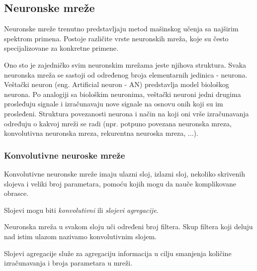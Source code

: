 \documentclass{article}
\begin{document}
\subsection{Neuronske mreže}
Neuronske mreže trenutno predstavljaju metod mašinskog učenja sa najširim spektrom primena. Postoje različite vrste neuronskih mreža, koje su često specijalizovane za konkretne primene. 

Ono sto je zajedničko svim neuronskim mrežama jeste njihova struktura. Svaka neuronska mreža se sastoji od određenog broja elementarnih jedinica - neurona. Veštački neuron (eng. Artificial neuron - AN) predstavlja model biološkog neurona. Po analogiji sa biološkim neuronima, veštački neuroni jedni drugima prosleđuju
signale i izračunavaju nove signale na osnovu onih koji su im prosleđeni. Struktura povezanosti neurona
i način na koji oni vrše izračunavanja određuju o kakvoj mreži se
radi (npr. potpuno povezana neuronska mreza, konvolutivna neuronska mreza, rekurentna neuroska mreza, ...).


\subsubsection{Konvolutivne neuroske mreže}
Konvolutivne neuronske mreže imaju ulazni sloj, izlazni sloj, nekoliko skrivenih slojeva i veliki broj parametara, pomoću kojih mogu da nauče komplikovane obrasce.

Slojevi mogu biti \emph{konvolutivni} ili \emph{slojevi agregacije}. 

Neuronska mreža u svakom sloju uči određeni broj filtera. Skup filtera koji deluju nad istim ulazom nazivamo konvolutivnim slojem.

Slojevi agregacije služe za agregaciju informacija u cilju smanjenja količine izračunavanja i broja parametara u mreži.
\end{document}
